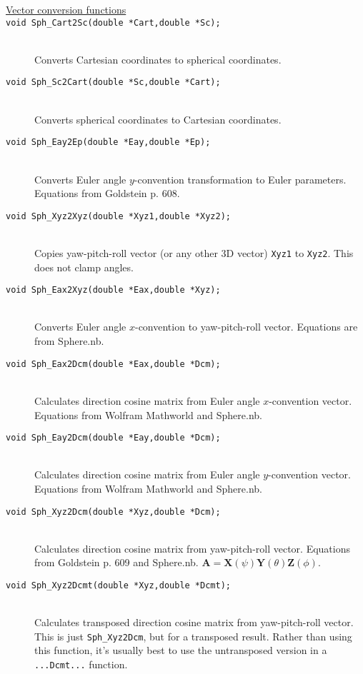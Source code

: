 \documentclass[11pt]{article}
\newcommand {\ttt} {\texttt}
\begin{document}
\begin{description}

\item[\underline{Vector conversion functions}]

\item[\ttt{void Sph\_Cart2Sc(double *Cart,double *Sc);}]
\hfill \\
Converts Cartesian coordinates to spherical coordinates.

\item[\ttt{void Sph\_Sc2Cart(double *Sc,double *Cart);}]
\hfill \\
Converts spherical coordinates to Cartesian coordinates.

\item[\ttt{void Sph\_Eay2Ep(double *Eay,double *Ep);}]
\hfill \\
Converts Euler angle $y$-convention transformation to Euler parameters. Equations from Goldstein p. 608.

\item[\ttt{void Sph\_Xyz2Xyz(double *Xyz1,double *Xyz2);}]
\hfill \\
Copies yaw-pitch-roll vector (or any other 3D vector) \ttt{Xyz1} to \ttt{Xyz2}. This does not clamp angles.

\item[\ttt{void Sph\_Eax2Xyz(double *Eax,double *Xyz);}]
\hfill \\
Converts Euler angle $x$-convention to yaw-pitch-roll vector. Equations are from Sphere.nb. 


\item[\ttt{void Sph\_Eax2Dcm(double *Eax,double *Dcm);}]
\hfill \\
Calculates direction cosine matrix from Euler angle $x$-convention vector. Equations from Wolfram Mathworld and Sphere.nb.

\item[\ttt{void Sph\_Eay2Dcm(double *Eay,double *Dcm);}]
\hfill \\
Calculates direction cosine matrix from Euler angle $y$-convention vector. Equations from Wolfram Mathworld and Sphere.nb.

\item[\ttt{void Sph\_Xyz2Dcm(double *Xyz,double *Dcm);}]
\hfill \\
Calculates direction cosine matrix from yaw-pitch-roll vector. Equations from Goldstein p. 609 and Sphere.nb. $\bm{A} = \bm{X}(\psi)\bm{Y}(\theta)\bm{Z}(\phi)$.

\item[\ttt{void Sph\_Xyz2Dcmt(double *Xyz,double *Dcmt);}]
\hfill \\
Calculates transposed direction cosine matrix from yaw-pitch-roll vector. This is just \ttt{Sph\_Xyz2Dcm}, but for a transposed result. Rather than using this function, it's usually best to use the untransposed version in a \ttt{...Dcmt...} function.


\end{description}
\end{document}
